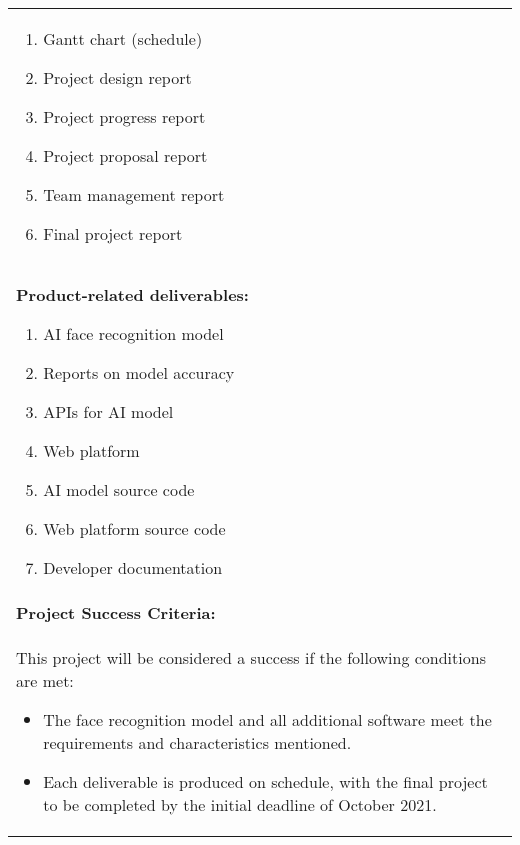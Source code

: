 \begin{longtable}{ | p{} l | }
{\begin{enumerate}
            \item Gantt chart (schedule)
            \item Project design report
            \item Project progress report
            \item Project proposal report
            \item Team management report
            \item Final project report
        \end{enumerate}
    } \\
    \multicolumn{2}{|p{\textwidth}|}{\textbf{Product-related deliverables:}
        \begin{enumerate}
            \item AI face recognition model
            \item Reports on model accuracy
            \item APIs for AI model
            \item Web platform
            \item AI model source code
            \item Web platform source code
            \item Developer documentation
        \end{enumerate}
    } \\
    \hline
    \multicolumn{2}{|l|}{\textbf{Project Success Criteria:}} \\
    \multicolumn{2}{|p{\textwidth}|}{This project will be considered a success if the following conditions are met:
        \begin{itemize}
            \item The face recognition model and all additional software meet the requirements and characteristics mentioned.
            \item Each deliverable is produced on schedule, with the final project to be completed by the initial deadline of October 2021.
        \end{itemize}
    } \\
    \hline
\end{longtable}
